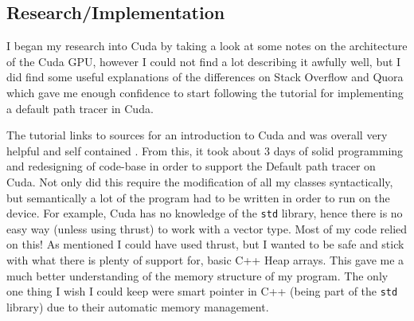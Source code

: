 \documentclass[conference]{IEEEtran}
\begin{document}
\subsection*{Research/Implementation}
I began my research into Cuda by taking a look at some notes on the architecture of the Cuda GPU, however I could not find a lot describing it awfully well, but I did find some useful explanations of the differences on Stack Overflow and Quora which gave me enough confidence to start following the tutorial for implementing a default path tracer in Cuda.

The tutorial links to sources for an introduction to Cuda and was overall very helpful and self contained \cite{cuda-pathtracing}. From this, it took about 3 days of solid programming and redesigning of code-base in order to support the Default path tracer on Cuda. Not only did this require the modification of all my classes syntactically, but semantically a lot of the program had to be written in order to run on the device. For example, Cuda has no knowledge of the \verb|std| library, hence there is no easy way (unless using thrust) to work with a vector type. Most of my code relied on this! As mentioned I could have used thrust, but I wanted to be safe and stick with what there is plenty of support for, basic C++ Heap arrays. This gave me a much better understanding of the memory structure of my program. The only one thing I wish I could keep were smart pointer in C++ (being part of the \verb|std| library) due to their automatic memory management. 
\end{document}
